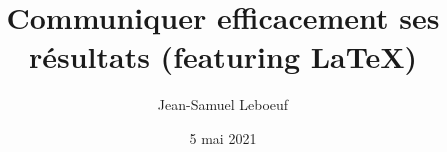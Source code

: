 \documentclass[aspectratio=169]{beamer}
\title{Communiquer efficacement ses résultats (featuring LaTeX)}
\author[J.S. Leboeuf]{Jean-Samuel Leboeuf}
\date{5 mai 2021}
\begin{document}
\begin{frame}
\thispagestyle{empty}
\titlepage
\end{frame}





\end{document}
